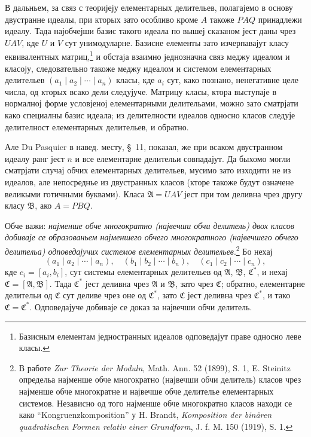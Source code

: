 ﻿\documentclass[11pt]{article}
\begin{document}
В дальньем, за связ с теоријеју елементарных делительев, полагајемо в основу двустранне идеалы, при кторых зато особливо кроме \(A\) такоже \(PAQ\) принадлежи идеалу. Тада најобчејши базис такого идеала по вышеј сказаном јест даны чрез \(UAV\), кде \(U\) и \(V\) сут унимодуларне. Базисне елементы зато изчерпавајут класу еквивалентных матриц,\footnote{Базисным елементам једностранных идеалов одповедајут праве односно леве класы.} и обстаја взаимно једнозначна связ меджу идеалом и класоју, следовательно такоже меджу идеалом и системом елементарных делительев \((a_1\mid a_2\mid\cdots\mid a_n)\) класы, кде \(a_i\) сут, како познано, ненегативне целе числа, од кторых всако дели следујуче. Матрицу класы, ктора выступаје в нормалној форме условјеној елементарными делительами, можно зато сматрјати како специалны базис идеала; из делителности идеалов односно класов следује делителност елементарных делительев, и обратно.

Але Du Pasquier в навед. месту, \S~11, показал, же при всаком двустранном идеалу ранг јест \(n\) и все елементарне делительи совпадајут. Да быхомо могли сматрјати случај обчих елементарных делительев, мусимо зато изходити не из идеалов, але непосреднье из двустранных класов (кторе такоже будут означене великыми готичными буквами). Класа \(\mathfrak A=UAV\) јест при том деливна чрез другу класу \(\mathfrak B\), ако \(A=PBQ\).

Обче важи: \emph{најменше обче многократно (највечши обчи делитель) двох класов добиваје се образованьем најменшего обчего многократного (највечшего обчего делительа) одповедајучих системов елементарных делительев}.\footnote{В работе \emph{Zur Theorie der Moduln}, Math. Ann. 52 (1899), S. 1, E. Steinitz определьа најменше обче многократно (највечши обчи делитель) класов чрез најменше обче многократне и највечше обче делителье елементарных системов. Независно од того најменше обче многократно класов находи се како ``Kongruenzkomposition'' у H. Brandt, \emph{Komposition der binären quadratischen Formen relativ einer Grundform}, J. f. M. 150 (1919), S. 1.} Бо нехај
\[
 (a_1\mid a_2\mid\cdots\mid a_n),\quad
 (b_1\mid b_2\mid\cdots\mid b_n),\quad
 (c_1\mid c_2\mid\cdots\mid c_n),
\]
кде \(c_i=[a_i,b_i]\), сут системы елементарных делительев од \(\mathfrak A\), \(\mathfrak B\), \(\mathfrak C^*\), и нехај \(\mathfrak C=[\mathfrak A,\mathfrak B]\). Тада \(\mathfrak C^*\) јест деливна чрез \(\mathfrak A\) и \(\mathfrak B\), зато чрез \(\mathfrak C\); обратно, елементарне делительи од \(\mathfrak C\) сут деливе чрез оне од \(\mathfrak C^*\), зато \(\mathfrak C\) јест деливна чрез \(\mathfrak C^*\), и тако \(\mathfrak C=\mathfrak C^*\). Одповедајуче добиваје се доказ за највечши обчи делитель.
\end{document}
